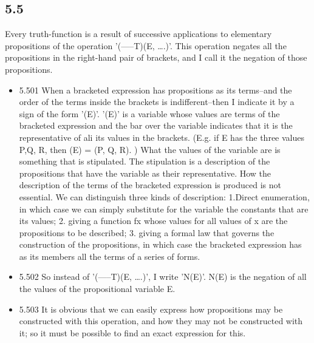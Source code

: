 \documentclass[11pt]{article}
\begin{document}
\subsection*{5.5}
\label{sec:orgdcc220f}
Every truth-function is a result of successive applications to
elementary propositions of the operation '(-----T)(E, \ldots{}.)'. This
operation negates all the propositions in the right-hand pair of brackets,
and I call it the negation of those propositions.
\begin{itemize}
\item 5.501
\label{sec:orgfec9a0b}
When a bracketed expression has propositions as its terms--and the
order of the terms inside the brackets is indifferent--then I indicate it
by a sign of the form '(E)'. '(E)' is a variable whose values are terms of
the bracketed expression and the bar over the variable indicates that it is
the representative of ali its values in the brackets. (E.g. if E has the
three values P,Q, R, then (E) = (P, Q, R). ) What the values of the
variable are is something that is stipulated. The stipulation is a
description of the propositions that have the variable as their
representative. How the description of the terms of the bracketed
expression is produced is not essential. We can distinguish three kinds of
description: 1.Direct enumeration, in which case we can simply substitute
for the variable the constants that are its values; 2. giving a function fx
whose values for all values of x are the propositions to be described; 3.
giving a formal law that governs the construction of the propositions, in
which case the bracketed expression has as its members all the terms of a
series of forms.
\item 5.502
\label{sec:org6be9688}
So instead of '(-----T)(E, \ldots{}.)', I write 'N(E)'. N(E) is the
negation of all the values of the propositional variable E.
\item 5.503
\label{sec:org8ea7f39}
It is obvious that we can easily express how propositions may be
constructed with this operation, and how they may not be constructed with
it; so it must be possible to find an exact expression for this.
\end{itemize}
\end{document}
